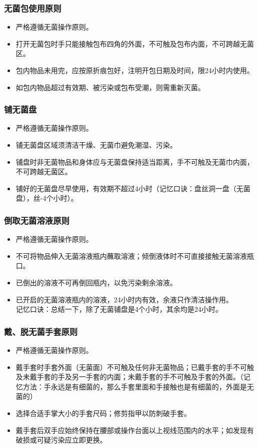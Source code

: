 \documentclass[11pt, a4paper]{ctexart}
\begin{document}
\subsubsection{无菌包使用原则}
\begin{itemize}
	\item 严格遵循无菌操作原则。
	\item 打开无菌包时手只能接触包布四角的外面，不可触及包布内面，不可跨越无菌区。
	\item 包内物品未用完，应按原折痕包好，注明开包日期及时间，限24小时内使用。
	\item 如包内物品超过有效期、被污染或包布受潮，则需重新灭菌。
\end{itemize}

\subsubsection{铺无菌盘}
\begin{itemize}
	\item 严格遵循无菌操作原则。
	\item 铺无菌盘区域须清洁干燥、无菌巾避免潮湿、污染。
	\item 铺盘时非无菌物品和身体应与无菌盘保持适当距离，手不可触及无菌巾内面，不可跨越无菌区。
	\item 铺好的无菌盘尽早使用，有效期不超过4小时（记忆口诀：盘丝洞一盘（无菌盘），丝-4个小时）。
\end{itemize}

\subsubsection{倒取无菌溶液原则}
\begin{itemize}
	\item 严格遵循无菌操作原则。
	\item 不可将物品伸入无菌溶液瓶内蘸取溶液；倾倒液体时不可直接接触无菌溶液瓶口。
	\item 已倒出的溶液不可再倒回瓶内，以免污染剩余溶液。
	\item 已开启的无菌溶液瓶内的溶液，24小时内有效，余液只作清洁操作用。\\
	      记忆口诀：总结一下，除了无菌铺盘是4个小时，其余均是24小时。
\end{itemize}

\subsubsection{戴、脱无菌手套原则}
\begin{itemize}
	\item 严格遵循无菌操作原则。
	\item 戴手套时手套外面（无菌面）不可触及任何非无菌物品；已戴手套的手不可触及未戴手套的手及另一手套的内面；未戴手套的手不可触及手套的外面。（记忆方法：手永远是有细菌的，那么手套里面和手接触也是有细菌的，外面是无菌的）
	\item 选择合适手掌大小的手套尺码；修剪指甲以防刺破手套。
	\item 戴手套后双手应始终保持在腰部或操作台面以上视线范围内的水平；如发现有破损或可疑污染应立即更换。
\end{itemize}
\end{document}
